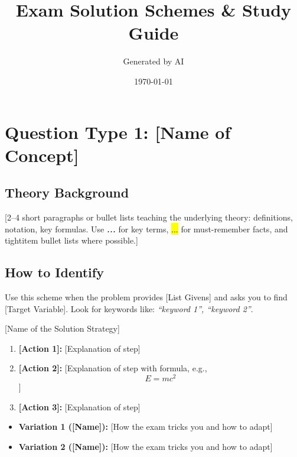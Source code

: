 \documentclass[12pt, a4paper]{article}
\newcommand{\term}[1]{\textbf{\textit{#1}}}        %
\newcommand{\imp}[1]{\hl{#1}}                       %
\begin{document}
\title{Exam Solution Schemes \& Study Guide}
\author{Generated by AI}
\date{\today}
\maketitle
\tableofcontents
\newpage


\section{Question Type 1: [Name of Concept]}

\subsection*{Theory Background}
[2--4 short paragraphs or bullet lists teaching the underlying theory: definitions, notation, key formulas. Use \term{...} for key terms, \imp{...} for must-remember facts, and tightitem bullet lists where possible.]

\begin{theorybox}
\end{theorybox}

\subsection*{How to Identify}
Use this scheme when the problem provides [List Givens] and asks you to find [Target Variable]. Look for keywords like: \textit{``keyword 1'', ``keyword 2''}.

\begin{schemebox}{[Name of the Solution Strategy]}
\begin{enumerate}[label=\textbf{Step \arabic*:}, leftmargin=*]
    \item \textbf{[Action 1]:} [Explanation of step]
    \item \textbf{[Action 2]:} [Explanation of step with formula, e.g., \[E = mc^2\]]
    \item \textbf{[Action 3]:} [Explanation of step]
\end{enumerate}
\end{schemebox}

\begin{trapbox}
\begin{itemize}
    \item \textbf{Variation 1 ([Name]):} [How the exam tricks you and how to adapt]
    \item \textbf{Variation 2 ([Name]):} [How the exam tricks you and how to adapt]
\end{itemize}
\end{trapbox}
\end{document}
